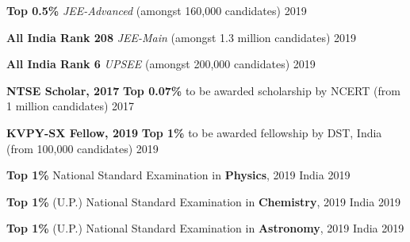 \begin{cvhonors}
 
  \cvhonor
  {\textbf{Top 0.5\%}}
  {\textit{JEE-Advanced} (amongst 160,000 candidates)}
  {}
  {2019}

  \cvhonor
  {\textbf{All India Rank 208}}
  {\textit{JEE-Main} (amongst 1.3 million candidates)}
  {}
  {2019}

  \cvhonor
  {\textbf{All India Rank 6}}
  {\textit{UPSEE} (amongst 200,000 candidates)}
  {}
  {2019}
  
  \cvhonor
  {\textbf{NTSE Scholar, 2017}}
  {\textbf{Top 0.07\%} to be awarded scholarship by NCERT (from 1 million candidates)}
  {}
  {2017}

  \cvhonor
  {\textbf{KVPY-SX Fellow, 2019}}
  {\textbf{Top 1\%} to be awarded fellowship by DST, India (from 100,000 candidates)}
  {}
  {2019}

  \cvhonor
  {\textbf{Top 1\%}} 
  {National Standard Examination in \textbf{Physics}, 2019}
  {India}
  {2019}

  \cvhonor
  {\textbf{Top 1\%} (U.P.)} 
  {National Standard Examination in \textbf{Chemistry}, 2019}
  {India}
  {2019}

  \cvhonor
  {\textbf{Top 1\%} (U.P.)} 
  {National Standard Examination in \textbf{Astronomy}, 2019}
  {India}
  {2019}

\end{cvhonors}

